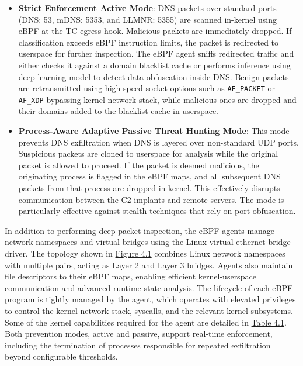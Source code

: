 \documentclass [11pt, proquest] {uwthesis}[2020/02/24]
\begin{document}
\begin{itemize}[itemsep=1pt,parsep=0pt]
    \item \textbf{Strict Enforcement Active Mode}: DNS packets over standard ports (DNS: 53, mDNS: 5353, and LLMNR: 5355) are scanned in-kernel using eBPF at the TC egress hook. Malicious packets are immediately dropped. If classification exceeds eBPF instruction limits, the packet is redirected to userspace for further inspection. The eBPF agent sniffs redirected traffic and either checks it against a domain blacklist cache or performs inference using deep learning model to detect data obfuscation inside DNS. Benign packets are retransmitted using high-speed socket options such as \texttt{AF\_PACKET} or \texttt{AF\_XDP} bypassing kernel network stack, while malicious ones are dropped and their domains added to the blacklist cache in userspace.
    
    \item \textbf{Process-Aware Adaptive Passive Threat Hunting Mode}: This mode prevents DNS exfiltration when DNS is layered over non-standard UDP ports. Suspicious packets are cloned to userspace for analysis while the original packet is allowed to proceed. If the packet is deemed malicious, the originating process is flagged in the eBPF maps, and all subsequent DNS packets from that process are dropped in-kernel. This effectively disrupts communication between the C2 implants and remote servers. The mode is particularly effective against stealth techniques that rely on port obfuscation.
    
\end{itemize}
\newpage
In addition to performing deep packet inspection, the eBPF agents manage network namespaces and virtual bridges using the Linux virtual ethernet bridge driver. The topology shown in \hyperref[sec:dp_eBPF_agent_net_topology]{Figure 4.1} combines Linux network namespaces with multiple pairs, acting as Layer 2 and Layer 3 bridges. Agents also maintain file descriptors to their eBPF maps, enabling efficient kernel-userspace communication and advanced runtime state analysis. The lifecycle of each eBPF program is tightly managed by the agent, which operates with elevated privileges to control the kernel network stack, syscalls, and the relevant kernel subsystems. Some of the kernel capabilities required for the agent are detailed in \hyperref[sec:dp_kernel_cap]{Table 4.1}. Both prevention modes, active and passive, support real-time enforcement, including the termination of processes responsible for repeated exfiltration beyond configurable thresholds.
\end{document}
